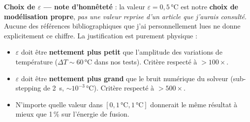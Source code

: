 \documentclass[11pt,a4paper]{article}
\begin{document}
\begin{honnete}
\textbf{Choix de $\varepsilon$ — note d'honnêteté} : la valeur $\varepsilon = 0{,}5\,\si{\celsius}$
est notre \textbf{choix de modélisation propre}, \emph{pas une valeur reprise d'un
article que j'aurais consulté}. Aucune des références bibliographiques que j'ai
personnellement lues ne donne explicitement ce chiffre. La justification est purement
physique :
\begin{itemize}[itemsep=0pt]
\item $\varepsilon$ doit être \textbf{nettement plus petit} que l'amplitude des variations
de température ($\Delta T \sim 60\,\si{\celsius}$ dans nos tests). Critère respecté à $> 100\times$.
\item $\varepsilon$ doit être \textbf{nettement plus grand} que le bruit numérique du
solveur (sub-stepping de \SI{2}{\second}, $\sim 10^{-3}\,\si{\celsius}$). Critère respecté à $> 500\times$.
\item N'importe quelle valeur dans $[0{,}1\,\si{\celsius}, 1\,\si{\celsius}]$ donnerait
le même résultat à mieux que 1\,\% sur l'énergie de fusion.
\end{itemize}
\end{honnete}
\end{document}
